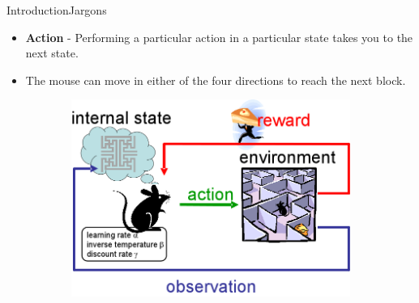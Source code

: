 \documentclass[10pt]{beamer}
\begin{document}
\begin{frame}{Introduction}{Jargons}

\begin{itemize}
\item \textbf{Action} - Performing a particular action in a particular state takes you to the next state. 
\item The mouse can move in either of the four directions to reach the next block.
\end{itemize}

\begin{figure}[!htb]
\centering
\begin{subfigure}[t]{0.6\linewidth}
\includegraphics[width=.9\textwidth]{assets/mouserl.png}
\end{subfigure}

\vspace{0.1in}
\label{fig:tripEmb}
\end{figure}

\end{frame}
\end{document}
